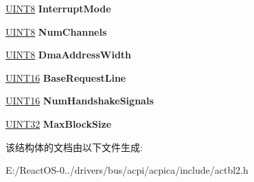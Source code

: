 \begin{DoxyCompactItemize}
\hyperlink{_processor_bind_8h_ab27e9918b538ce9d8ca692479b375b6a}{U\+I\+N\+T8} {\bfseries Interrupt\+Mode}
\item 
\mbox{\label{structacpi__csrt__shared__info_a5cd6d9dcce410d7d0204f896b6ed34b3}} 
\hyperlink{_processor_bind_8h_ab27e9918b538ce9d8ca692479b375b6a}{U\+I\+N\+T8} {\bfseries Num\+Channels}
\item 
\mbox{\label{structacpi__csrt__shared__info_ace17b93b533955da915e8190113cb825}} 
\hyperlink{_processor_bind_8h_ab27e9918b538ce9d8ca692479b375b6a}{U\+I\+N\+T8} {\bfseries Dma\+Address\+Width}
\item 
\mbox{\label{structacpi__csrt__shared__info_aa5b9414ce43f23528d471c4807775f88}} 
\hyperlink{_processor_bind_8h_a09f1a1fb2293e33483cc8d44aefb1eb1}{U\+I\+N\+T16} {\bfseries Base\+Request\+Line}
\item 
\mbox{\label{structacpi__csrt__shared__info_af2e6d565f17d03637393807046f1eb54}} 
\hyperlink{_processor_bind_8h_a09f1a1fb2293e33483cc8d44aefb1eb1}{U\+I\+N\+T16} {\bfseries Num\+Handshake\+Signals}
\item 
\mbox{\label{structacpi__csrt__shared__info_af88c6d7281a2b25ec69ed0ca5403e9c5}} 
\hyperlink{_processor_bind_8h_ae1e6edbbc26d6fbc71a90190d0266018}{U\+I\+N\+T32} {\bfseries Max\+Block\+Size}
\end{DoxyCompactItemize}


该结构体的文档由以下文件生成\+:\begin{DoxyCompactItemize}
\item 
E\+:/\+React\+O\+S-\/0../drivers/bus/acpi/acpica/include/actbl2.\+h\end{DoxyCompactItemize}
